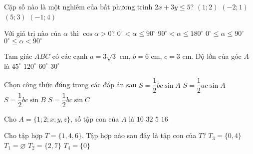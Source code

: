 \begin{ex}%
	Cặp số nào là một nghiêm của bất phương trình $2x+3y \leq 5$?
	\choice
	{$(1; 2)$}
	{\True $(-2; 1)$}
	{$(5; 3)$}
	{$(-1; 4)$}
\end{ex}

\begin{ex}%
	Với giá trị nào của $\alpha$ thì $\cos \alpha > 0$?
	\choice
	{$0^{\circ} < \alpha \leq 90^{\circ}$}
	{$90^{\circ} < \alpha \leq 180^{\circ}$}
	{$0^{\circ} \leq \alpha \leq 90^{\circ}$}
	{\True $0^{\circ} \leq \alpha < 90^{\circ}$}
\end{ex}
\begin{ex}%
	Tam giác $A B C$ có các cạnh $a=3 \sqrt{3}$ cm, $b=6$ cm, $c=3$ cm. Độ lớn của góc $A$ là
	\choice
	{$45^{\circ}$}
	{$120^{\circ}$}
	{\True $60^{\circ}$}
	{$30^{\circ}$}
\end{ex}

\begin{ex}%
	Chọn công thức đúng trong các đáp án sau
	\choice
	{\True $S=\dfrac{1}{2} b c \sin A$}
	{$S=\dfrac{1}{2} a c \sin A$}
	{$S=\dfrac{1}{2} b c \sin B$}
	{$S=\dfrac{1}{2} b c \sin C$}
\end{ex}

\begin{ex}%
	Cho $A=\{1 ; 2 ; x ; y, z\}$, số tập con của $A$ là
	\choice
	{$10$}
	{\True $32$}
	{$5$}
	{$16$}
\end{ex}

\begin{ex}%
	Cho tập hợp $T=\{1,4,6\}$. Tập hợp nào sau đây là tập con của $T$?
	\choice
	{$T_3=\{0,4\}$}
	{\True $T_1=\varnothing$}
	{$T_2=\{2,7\}$}
	{$T_4=\{0\}$}
\end{ex}

